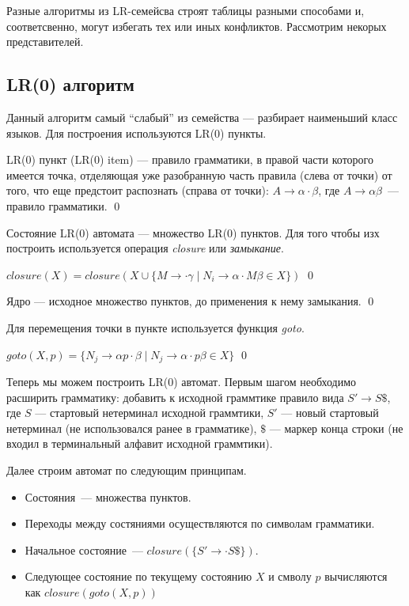 Разные алгоритмы из LR-семейсва строят таблицы разными способами и, соответсвенно, могут избегать тех или иных конфликтов. Рассмотрим некорых представителей.

\subsection{LR(0) алгоритм}

Данный алгоритм самый ``слабый'' из семейства --- разбирает наименьший класс языков.
Для построения используются LR(0) пункты.

\begin{definition}
LR(0) пункт (LR(0) item) --- правило грамматики, в правой части которого имеется точка, отделяющая уже разобранную часть правила (слева от точки) от того, что еще предстоит распознать (справа от точки): $A \to \alpha \cdot \beta$, где $A \to \alpha \beta$~--- правило грамматики.
\qed
\end{definition}

Состояние LR(0) автомата --- множество LR(0) пунктов. Для того чтобы изх построить используется операция \textit{closure} или \textit{замыкание}.

\begin{definition}
$closure(X)  = closure(X \cup \{M \rightarrow \cdot \gamma \mid N_i \rightarrow \alpha\cdot M\beta \in X \})$
\qed
\end{definition}

\begin{definition}
Ядро --- исходное множество пунктов, до применения к нему замыкания.
\qed
\end{definition}

Для перемещения точки в пункте используется функция \textit{goto}.

\begin{definition}
$goto(X,p)  = \{N_j \rightarrow \alpha p \cdot \beta \mid N_j \rightarrow \alpha\cdot p\beta \in X \}$
\qed
\end{definition}

Теперь мы можем построить LR(0) автомат.
Первым шагом необходимо расширить грамматику: добавить к исходной граммтике правило вида $S' \to S \$$, где $S$ --- стартовый нетерминал исходной граммтики, $S'$ --- новый стартовый нетерминал (не использовался ранее в грамматике), $\$$ --- маркер конца строки (не входил в терминальный алфавит исходной граммтики).

Далее строим автомат по следующим принципам.

\begin{itemize}
    \item Состояния~--- множества пунктов.
    \item Переходы между состяниями осуществляются по символам грамматики.
    \item Начальное состояние~--- $closure(\{S'\to
    \cdot S \$\})$.
    \item Следующее состояние по текущему состоянию $X$ и смволу $p$ вычисляются как $closure(goto(X, p))$
  \end{itemize}

